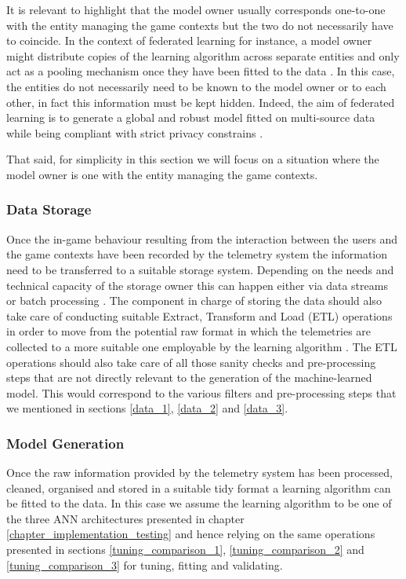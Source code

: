 It is relevant to highlight that the model owner usually corresponds one-to-one with the entity managing the game contexts but the two do not necessarily have to coincide. In the context of federated learning  \cite{yang2019federated} for instance, a model owner might distribute copies of the learning algorithm across separate entities and only act as a pooling mechanism  once they have been fitted to the data \cite{kairouz2021advances}. In this case, the entities do not necessarily need to be known to the model owner or to each other, in fact this information must be kept hidden. Indeed, the aim of federated learning is to generate a global and robust model fitted on multi-source data while being compliant with strict privacy constrains \cite{yang2019federated, kairouz2021advances}. 

That said, for simplicity in this section we will focus on a situation where the model owner is one with the entity managing the game contexts.

\subsubsection{Data Storage}
Once the in-game behaviour resulting from the interaction between the users and the game contexts have been recorded by the telemetry system the information need to be transferred to a suitable storage system. Depending on the needs and technical capacity of the storage owner this can happen either via data streams or batch processing \cite{el2016game}. The component in charge of storing the data should also take care of conducting suitable Extract, Transform and Load (ETL) operations in order to move from the potential raw format in which the telemetries are collected to a more suitable one employable by the learning algorithm \cite{el2016game}. The ETL operations should also take care of all those sanity checks and pre-processing steps that are not directly relevant to the generation of the machine-learned model. This would correspond to the various filters and pre-processing steps that we mentioned in sections \ref{data_1}, \ref{data_2} and \ref{data_3}.

\subsubsection{Model Generation}
Once the raw information provided by the telemetry system has been processed, cleaned, organised and stored in a suitable tidy format a learning algorithm can be fitted to the data. In this case we assume the learning algorithm to be one of the three ANN architectures presented in chapter \ref{chapter_implementation_testing} and hence relying on the same operations presented in sections \ref{tuning_comparison_1}, \ref{tuning_comparison_2} and \ref{tuning_comparison_3} for tuning, fitting and validating.

